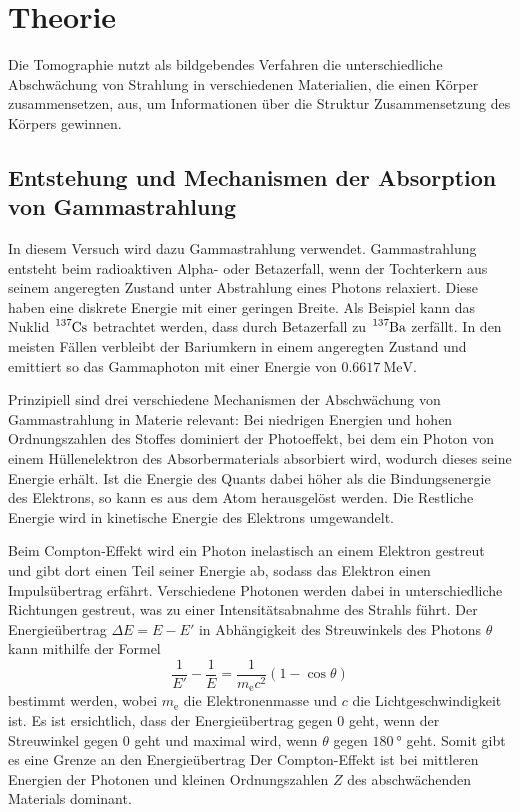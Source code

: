 \section{Theorie}
\label{sec:Theorie}

Die Tomographie nutzt als bildgebendes Verfahren die unterschiedliche Abschwächung von Strahlung in verschiedenen Materialien, die einen Körper zusammensetzen, aus, um Informationen über die Struktur Zusammensetzung des Körpers gewinnen.

\subsection{Entstehung und Mechanismen der Absorption von Gammastrahlung}

In diesem Versuch wird dazu Gammastrahlung verwendet. Gammastrahlung entsteht beim radioaktiven Alpha- oder Betazerfall, wenn der Tochterkern aus seinem angeregten Zustand unter Abstrahlung eines Photons relaxiert. Diese haben eine diskrete Energie mit einer geringen Breite.
Als Beispiel kann das Nuklid $\ce{^{137}Cs}$ betrachtet werden, dass durch Betazerfall zu $\ce{^{137}Ba}$ zerfällt. In den meisten Fällen verbleibt der Bariumkern in einem angeregten Zustand und emittiert so das Gammaphoton mit einer Energie von $\SI{0.6617}{\mega\electronvolt}$.

Prinzipiell sind drei verschiedene Mechanismen der Abschwächung von Gammastrahlung in Materie relevant: Bei niedrigen Energien und hohen Ordnungszahlen des Stoffes dominiert der Photoeffekt, bei dem ein Photon von einem Hüllenelektron des Absorbermaterials
absorbiert wird, wodurch dieses seine Energie erhält. Ist die Energie des Quants dabei höher als die Bindungsenergie des Elektrons, so kann es aus dem Atom herausgelöst werden. Die Restliche Energie wird in kinetische Energie des Elektrons umgewandelt.

Beim Compton-Effekt wird ein Photon inelastisch an einem Elektron gestreut und gibt dort einen Teil seiner Energie ab, sodass das Elektron einen Impulsübertrag erfährt.
Verschiedene Photonen werden dabei in unterschiedliche Richtungen gestreut, was zu einer Intensitätsabnahme
des Strahls führt.
Der Energieübertrag $\Delta E = E - E'$ in Abhängigkeit des Streuwinkels des Photons $\theta$ kann mithilfe der Formel
\begin{equation}
	\frac{1}{E'} - \frac{1}{E} = \frac{1}{m_\text{e} c^2} (1-\cos\theta)
\end{equation}
bestimmt werden, wobei $m_\text{e}$ die Elektronenmasse und $c$ die Lichtgeschwindigkeit ist. Es ist ersichtlich, dass der Energieübertrag gegen 0 geht, wenn der Streuwinkel gegen 0 geht und maximal wird, wenn $\theta$ gegen $\SI{180}{\degree}$ geht. Somit gibt es eine Grenze an den Energieübertrag
Der Compton-Effekt ist bei mittleren Energien der Photonen und kleinen Ordnungszahlen $Z$ des abschwächenden Materials dominant.

